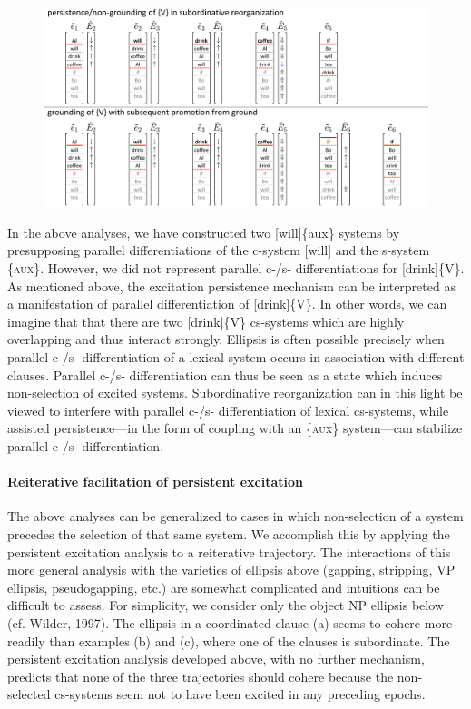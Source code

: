   
\begin{figure}
\includegraphics[width=\textwidth]{figures/Tilsen-img149.png}
\caption{\missingcaption}
\label{fig:}
\end{figure}
 

  In the above analyses, we have constructed two [will]\{aux\} systems by presupposing parallel differentiations of the c-system [will] and the s-system \{\textsc{aux}\}. However, we did not represent parallel c-/s- differentiations for [drink]\{V\}. As mentioned above, the excitation persistence mechanism can be interpreted as a manifestation of parallel differentiation of [drink]\{V\}. In other words, we can imagine that that there are two [drink]\{V\} cs-systems which are highly overlapping and thus interact strongly. Ellipsis is often possible precisely when parallel c-/s- differentiation of a lexical system occurs in association with different clauses. Parallel c-/s- differentiation can thus be seen as a state which induces non-selection of excited systems. Subordinative reorganization can in this light be viewed to interfere with parallel c-/s- differentiation of lexical cs-systems, while assisted persistence—in the form of coupling with an \{\textsc{aux}\} system—can stabilize parallel c-/s- differentiation.

\paragraph{Reiterative facilitation of persistent excitation}

The above analyses can be generalized to cases in which non-selection of a system precedes the selection of that same system. We accomplish this by applying the persistent excitation analysis to a reiterative trajectory. The interactions of this more general analysis with the varieties of ellipsis above (gapping, stripping, VP ellipsis, pseudogapping, etc.) are somewhat complicated and intuitions can be difficult to assess. For simplicity, we consider only the object NP ellipsis below (cf. Wilder, 1997). The ellipsis in a coordinated clause (a) seems to cohere more readily than examples (b) and (c), where one of the clauses is subordinate. The persistent excitation analysis developed above, with no further mechanism, predicts that none of the three trajectories should cohere because the non-selected cs-systems seem not to have been excited in any preceding epochs.

